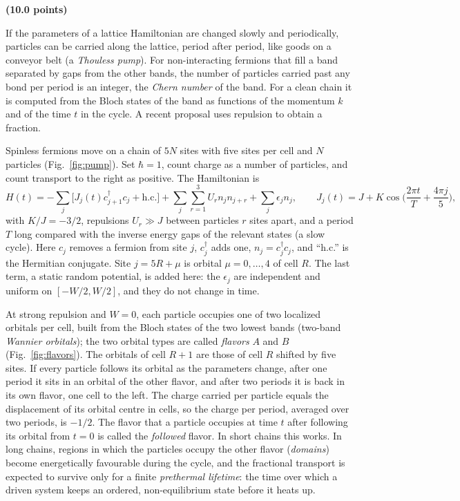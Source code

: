 \documentclass[11pt,a4paper]{article}
\newcounter{problemno}
\newcounter{figc}
\newcommand{\pagecode}{G}
\newcommand{\hc}{\mathrm{h.c.}}
\newcommand{\problem}[3]{\clearpage\setcounter{problemno}{#1}\renewcommand{\pagecode}{T#1}\setcounter{page}{1}\setcounter{figc}{0}{\LARGE\bfseries\color{ink}Problem #1: #2}\hfill{\large\bfseries(#3 points)}\par\medskip}
\begin{document}
\problem{3}{Disorder in a two-cycle quantum pump}{10.0}

If the parameters of a lattice Hamiltonian are changed slowly and periodically, particles can be carried along the lattice, period after period, like goods on a conveyor belt (a \emph{Thouless pump}). For non-interacting fermions that fill a band separated by gaps from the other bands, the number of particles carried past any bond per period is an integer, the \emph{Chern number} of the band. For a clean chain it is computed from the Bloch states of the band as functions of the momentum $k$ and of the time $t$ in the cycle. A recent proposal uses repulsion to obtain a fraction.

Spinless fermions move on a chain of $5N$ sites with five sites per cell and $N$ particles (Fig.~\ref{fig:pump}). Set $\hbar=1$, count charge as a number of particles, and count transport to the right as positive. The Hamiltonian is
\[
H(t)=-\sum_j\big[J_j(t)c_{j+1}^\dagger c_j+\hc\big]+\sum_j\sum_{r=1}^{3}U_rn_jn_{j+r}+\sum_j\epsilon_jn_j,\qquad
J_j(t)=J+K\cos\Big(\frac{2\pi t}{T}+\frac{4\pi j}{5}\Big),
\]
with $K/J=-3/2$, repulsions $U_r\gg J$ between particles $r$ sites apart, and a period $T$ long compared with the inverse energy gaps of the relevant states (a slow cycle). Here $c_j$ removes a fermion from site $j$, $c_j^\dagger$ adds one, $n_j=c_j^\dagger c_j$, and ``h.c.'' is the Hermitian conjugate. Site $j=5R+\mu$ is orbital $\mu=0,\dots,4$ of cell $R$. The last term, a static random potential, is added here: the $\epsilon_j$ are independent and uniform on $[-W/2,W/2]$, and they do not change in time.

At strong repulsion and $W=0$, each particle occupies one of two localized orbitals per cell, built from the Bloch states of the two lowest bands (two-band \emph{Wannier orbitals}); the two orbital types are called \emph{flavors} $A$ and $B$ (Fig.~\ref{fig:flavors}). The orbitals of cell $R+1$ are those of cell $R$ shifted by five sites. If every particle follows its orbital as the parameters change, after one period it sits in an orbital of the other flavor, and after two periods it is back in its own flavor, one cell to the left. The charge carried per particle equals the displacement of its orbital centre in cells, so the charge per period, averaged over two periods, is $-1/2$. The flavor that a particle occupies at time $t$ after following its orbital from $t=0$ is called the \emph{followed} flavor. In short chains this works. In long chains, regions in which the particles occupy the other flavor (\emph{domains}) become energetically favourable during the cycle, and the fractional transport is expected to survive only for a finite \emph{prethermal lifetime}: the time over which a driven system keeps an ordered, non-equilibrium state before it heats up.
\end{document}
